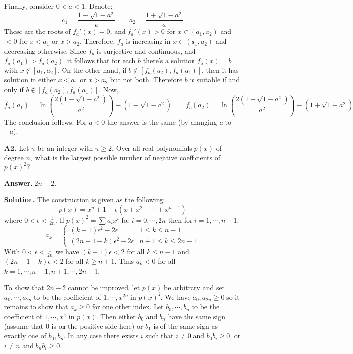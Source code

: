 \documentclass[11pt,a4paper]{article}
\begin{document}
\begin{enumerate}
	    Finally, 
	    consider $0 < a < 1$. 
	    Denote: 
	    \[
	    a_1 = \frac{1 - \sqrt{1-a^2}}{a}
	    \qquad 
	    a_2 = \frac{1 + \sqrt{1-a^2}}{a}
	    \]
	    These are the roots of $f_a'(x)=0$, 
	    and $f_a'(x)>0$ for $x\in (a_1, a_2)$ and $<0$ for $x<a_1$ or $x>a_2$. 
	    Therefore, $f_a$ is increasing in $x\in (a_1, a_2)$ and decreasing otherwise. 
	    Since $f_a$ is surjective and continuous, 
	    and $f_a(a_1) > f_a(a_2)$, 
	    it follows that for each $b$ there's a solution $f_a(x)=b$ with $x\not\in [a_1, a_2]$. 
	    On the other hand, if $b\not\in [f_a(a_2), f_a(a_1)]$, 
	    then it has solution in either $x < a_1$ or $x>a_2$ but not both. 
	    Therefore $b$ is suitable if and only if $b\not\in [f_a(a_2), f_a(a_1)]$. 
	    Now, 
	    \begin{equation}
	    	f_a(a_1) = 
	    	\ln(\frac{2(1 - \sqrt{1-a^2})}{a^2}) - (1 - \sqrt{1-a^2})
	    	\qquad
	    	f_a(a_2) = 
	    	\ln(\frac{2(1 + \sqrt{1-a^2})}{a^2}) - (1 + \sqrt{1-a^2})
	    \end{equation}
        The conclusion follows. 
        For $a < 0$ the answer is the same (by changing $a$ to $-a$). 
		
		\item [\textbf{A2.}]
		Let $n$ be an integer with $n\geq 2.$ Over all real polynomials $p(x)$ of degree $n,$ what is the largest possible number of negative coefficients of $p(x)^2?$
		
		\textbf{Answer.} $2n-2$. 
		
		\textbf{Solution.} 
		The construction is given as the following: 
		\begin{equation}
			p(x) = x^n + 1 - \epsilon(x + x^2+\cdots + x^{n-1})
		\end{equation}
	    where $0 < \epsilon < \frac{1}{2n}$. 
	    If $p(x)^2 = \sum a_ix^i$ for $i=0, \cdots, 2n$ then for $i=1, \cdots, n-1$: 
	    \begin{equation}
	    	a_k = 
	    	\begin{cases}
	    		(k-1)\epsilon^2 - 2\epsilon & 1\le k\le n-1\\
	    		(2n-1-k)\epsilon^2 - 2\epsilon & n + 1\le k\le 2n-1
	    	\end{cases}
	    \end{equation}
        With $0<\epsilon<\frac{1}{2n}$ we have $(k-1)\epsilon < 2$ for all $k\le n-1$ 
        and $(2n-1-k)\epsilon<2$ for all $k \ge n+1$. 
        Thus $a_k<0$ for all $k=1, \cdots, n-1, n+1, \cdots, 2n-1$. 
        
        To show that $2n-2$ cannot be improved, 
        let $p(x)$ be arbitrary and set $a_0, \cdots, a_{2n}$ to be the coefficient of $1, \cdots, x^{2n}$ in $p(x)^2$. 
        We have $a_0, a_{2n}\ge 0$ so it remains to show that $a_k\ge 0$ for one other index. 
        Let $b_0, \cdots, b_n$ to be the coefficient of $1, \cdots, x^n$ in $p(x)$. 
        Then either $b_0$ and $b_n$ have the same sign (assume that 0 is on the positive side here)
        or $b_1$ is of the same sign as exactly one of $b_0, b_n$. 
        In any case there exists $i$ such that $i\neq 0$ and $b_0b_i\ge 0$, 
        or $i\neq n$ and $b_nb_i\ge 0$. 
        

\end{enumerate}
\end{document}
